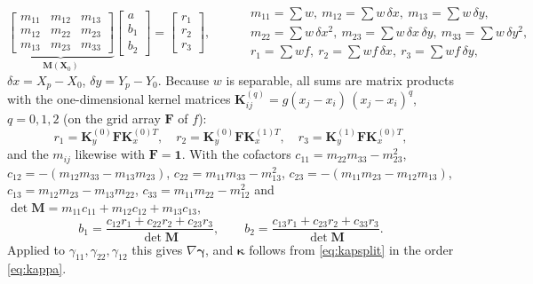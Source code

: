 \documentclass[11pt,a4paper]{article}
\newcommand{\bgam}{\bm{\gamma}}
\newcommand{\bkap}{\bm{\kappa}}
\newcommand{\bX}{\bm{X}}
\theoremstyle{plain}
\theoremstyle{remark}
\begin{document}
\begin{equation}
  \underbrace{\begin{bmatrix}m_{11}&m_{12}&m_{13}\\m_{12}&m_{22}&m_{23}\\m_{13}&m_{23}&m_{33}\end{bmatrix}}_{\bm M(\bX_0)}
  \begin{bmatrix}a\\b_1\\b_2\end{bmatrix}=
  \begin{bmatrix}r_1\\r_2\\r_3\end{bmatrix},\qquad
  \begin{aligned}
  &m_{11}=\textstyle\sum w,\ m_{12}=\sum w\,\delta x,\ m_{13}=\sum w\,\delta y,\\
  &m_{22}=\textstyle\sum w\,\delta x^2,\ m_{23}=\sum w\,\delta x\,\delta y,\ m_{33}=\sum w\,\delta y^2,\\
  &r_1=\textstyle\sum wf,\ r_2=\sum wf\,\delta x,\ r_3=\sum wf\,\delta y,
  \end{aligned}
\end{equation}
$\delta x=X_p-X_0$, $\delta y=Y_p-Y_0$. Because $w$ is separable, all sums are matrix products with
the one-dimensional kernel matrices $\bm K^{(q)}_{ij}=g(x_j-x_i)\,(x_j-x_i)^q$, $q=0,1,2$ (on the
grid array $\bm F$ of $f$):
\begin{equation}
  r_1=\bm K_y^{(0)}\bm F\bm K_x^{(0)T},\quad r_2=\bm K_y^{(0)}\bm F\bm K_x^{(1)T},\quad
  r_3=\bm K_y^{(1)}\bm F\bm K_x^{(0)T},
\end{equation}
and the $m_{ij}$ likewise with $\bm F=\bm 1$. With the cofactors
$c_{11}=m_{22}m_{33}-m_{23}^2$, $c_{12}=-(m_{12}m_{33}-m_{13}m_{23})$, $c_{22}=m_{11}m_{33}-m_{13}^2$,
$c_{23}=-(m_{11}m_{23}-m_{12}m_{13})$, $c_{13}=m_{12}m_{23}-m_{13}m_{22}$,
$c_{33}=m_{11}m_{22}-m_{12}^2$ and $\det\bm M=m_{11}c_{11}+m_{12}c_{12}+m_{13}c_{13}$,
\begin{equation}
  b_1=\frac{c_{12}r_1+c_{22}r_2+c_{23}r_3}{\det\bm M},\qquad
  b_2=\frac{c_{13}r_1+c_{23}r_2+c_{33}r_3}{\det\bm M} .
  \label{eq:mlssol}
\end{equation}
Applied to $\gamma_{11},\gamma_{22},\gamma_{12}$ this gives $\nabla\bgam$, and $\bkap$ follows from
\eqref{eq:kapsplit} in the order \eqref{eq:kappa}.
\end{document}

